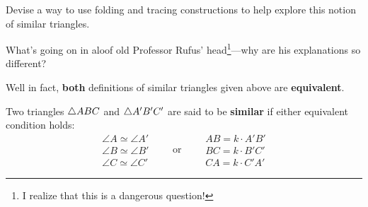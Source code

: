 \begin{ques} 
Devise a way to use folding and tracing constructions to help explore this notion
of similar triangles.
\end{ques}
\QM



\begin{ques} 
What's going on in aloof old Professor Rufus' head\footnote{I realize that
this is a dangerous question!}---why are his explanations so different?
\end{ques}

Well in fact, \textbf{both} definitions of similar triangles given
above are \textbf{equivalent}.


\begin{dfn} 
Two triangles $\triangle ABC$ and $\triangle A'B'C'$ are said to be
\textbf{similar} if either equivalent condition holds:
\[
\begin{array}{l}
\angle A \simeq \angle A'\\
\angle B \simeq \angle B' \\
\angle C \simeq \angle C'
\end{array}
\qquad\text{or}\qquad
\begin{array}{l}
AB = k\cdot A'B'\\
BC = k\cdot B'C' \\
CA = k\cdot C'A'
\end{array}
\]
\end{dfn}

